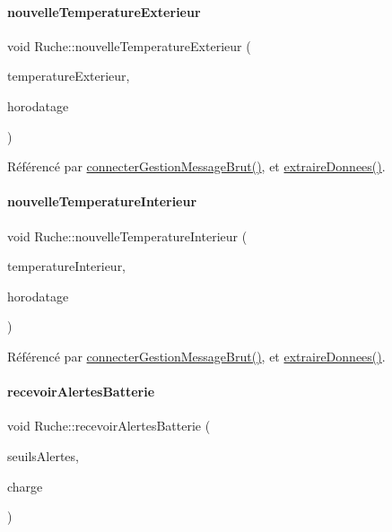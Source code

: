 \paragraph{\texorpdfstring{nouvelle\+Temperature\+Exterieur}{nouvelleTemperatureExterieur}}
{\footnotesize\ttfamily void Ruche\+::nouvelle\+Temperature\+Exterieur (\begin{DoxyParamCaption}\item[{Q\+String}]{temperature\+Exterieur,  }\item[{Q\+String}]{horodatage }\end{DoxyParamCaption})\hspace{0.3cm}{\ttfamily [signal]}}



Référencé par \hyperlink{class_ruche_a9c8e7e3b529676c6dda3d936370af00f}{connecter\+Gestion\+Message\+Brut()}, et \hyperlink{class_ruche_a21c0dafeaec03d451590037343e6a3ca}{extraire\+Donnees()}.

\mbox{\label{class_ruche_ac4d6e0c0db4b5c992606bff88759b2c3}} 
\paragraph{\texorpdfstring{nouvelle\+Temperature\+Interieur}{nouvelleTemperatureInterieur}}
{\footnotesize\ttfamily void Ruche\+::nouvelle\+Temperature\+Interieur (\begin{DoxyParamCaption}\item[{Q\+String}]{temperature\+Interieur,  }\item[{Q\+String}]{horodatage }\end{DoxyParamCaption})\hspace{0.3cm}{\ttfamily [signal]}}



Référencé par \hyperlink{class_ruche_a9c8e7e3b529676c6dda3d936370af00f}{connecter\+Gestion\+Message\+Brut()}, et \hyperlink{class_ruche_a21c0dafeaec03d451590037343e6a3ca}{extraire\+Donnees()}.

\mbox{\label{class_ruche_aee278a316c2e462e43705e15a36ab43f}} 
\paragraph{\texorpdfstring{recevoir\+Alertes\+Batterie}{recevoirAlertesBatterie}}
{\footnotesize\ttfamily void Ruche\+::recevoir\+Alertes\+Batterie (\begin{DoxyParamCaption}\item[{\hyperlink{parametres_8h_aaa6de8207c94675264c90b10b613368d}{Seuils\+Alertes}}]{seuils\+Alertes,  }\item[{double}]{charge }\end{DoxyParamCaption})\hspace{0.3cm}{\ttfamily [slot]}}



